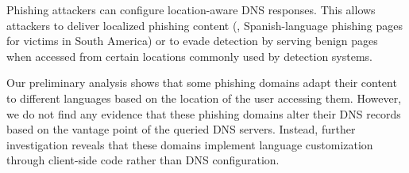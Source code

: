 
Phishing attackers can configure location-aware DNS responses.
This allows attackers to deliver localized phishing content (\eg, Spanish-language phishing pages for victims in South America) or to evade detection by serving benign pages when accessed from certain locations commonly used by detection systems.

Our preliminary analysis shows that some phishing domains adapt their content to different languages based on the location of the user accessing them. 
However, we do not find any evidence that these phishing domains alter their DNS records based on the vantage point of the queried DNS servers. 
Instead, further investigation reveals that these domains implement language customization through client-side code rather than DNS configuration.

